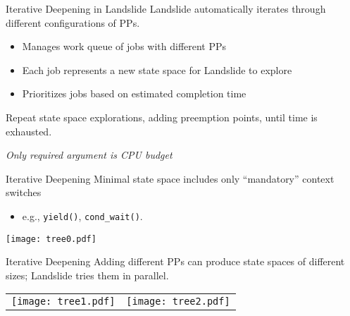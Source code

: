 \documentclass[xcolor=dvipsnames]{beamer}
\begin{document}
\begin{frame}{Iterative Deepening in Landslide}
	Landslide automatically iterates through different configurations of PPs.
	\begin{itemize}
		\item Manages work queue of jobs with different PPs
		\item Each job represents a new state space for Landslide to explore
		\item Prioritizes jobs based on estimated completion time
	\end{itemize}
	\linegap

	Repeat state space explorations, adding preemption points, until time is exhausted.

	\linegap
	{\em Only required argument is CPU budget}
\end{frame}

\begin{frame}{Iterative Deepening}
	Minimal state space includes only ``mandatory'' context switches
	\begin{itemize}
		\item e.g., {\tt yield()}, {\tt cond\_wait()}.
	\end{itemize}
	\vspace{0.29in}
	\begin{center}
		\texttt{[image: tree0.pdf]}
	\end{center}
\end{frame}

\begin{frame}{Iterative Deepening}
	Adding different PPs can produce state spaces of different sizes; Landslide tries them in parallel.
	\vspace{0.15in}
	\begin{center}
		\begin{tabular}{cc}
			\texttt{[image: tree1.pdf]} &
			\texttt{[image: tree2.pdf]}
		\end{tabular}
	\end{center}
\end{frame}
\end{document}
